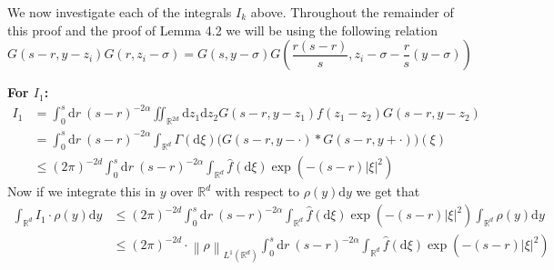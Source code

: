 \documentclass{article}
\numberwithin{equation}{section}
\newcommand{\R}{\mathbb{R}}
\newcommand{\Norm}[1]{\left\|  #1   \right\|}
\newcommand{\ud}{\ensuremath{\mathrm{d}}}
\begin{document}
We now investigate each of the integrals $I_k$ above. Throughout the remainder of this proof and the proof of Lemma 4.2 we will be using the following relation 
\begin{equation}
	G(s-r,y-z_i)G(r,z_i-\sigma)=G(s,y-\sigma)G\left(\dfrac{r(s-r)}{s},z_i-\sigma-\dfrac{r}{s}(y-\sigma)\right) \label{gsim}
\end{equation}

\noindent \textbf{For $I_1$:} 
\begin{align*}
I_1 &= \int_0^s \ud r \: (s-r)^{-2\alpha} \iint_{\R^{2d}} \ud z_1\ud z_2 G(s-r,y-z_1)f(z_1-z_2)G(s-r,y-z_2)
\\&= \int_0^s \ud r \: (s-r)^{-2\alpha} \int_{\R^{d}} \Gamma(\ud \xi) \big(G(s-r,y-\cdot)*G(s-r,y+\cdot)\big)(\xi)
\\&\le (2\pi)^{-2d}\int_0^s \ud r \: (s-r)^{-2\alpha} \int_{\R^{d}} \hat f(\ud \xi) \exp\left(-(s-r)|\xi|^2 \right)
\end{align*}
Now if we integrate this in $y$ over $\R^d$ with respect to $\rho(y)\ud y$ we get that 
\begin{align*} \int_{\R^d}I_1\cdot \rho(y)\ud y &\le (2\pi)^{-2d} \int_0^s \ud r \: (s-r)^{-2\alpha} \int_{\R^{d}} \hat f(\ud \xi) \exp\left(-(s-r)|\xi|^2 \right)  \int_{\R^d}\rho(y)\ud y
\\ &\le (2\pi)^{-2d}\cdot \Norm{\rho}_{L^1(\R^d)} \int_0^s \ud r \: (s-r)^{-2\alpha} \int_{\R^{d}} \hat f(\ud \xi) \exp\left(-(s-r)|\xi|^2 \right) 
\end{align*}
\end{document}
